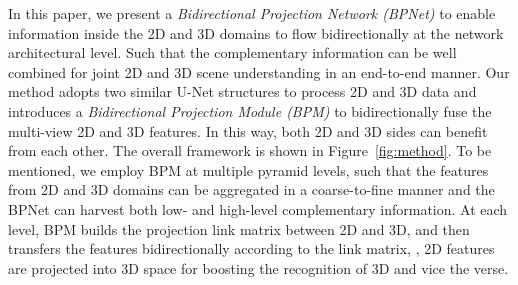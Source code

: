 \documentclass[final]{cvpr}
\begin{document}
In this paper,  we present a \emph{Bidirectional Projection Network (BPNet)} to enable information inside the 2D and 3D domains to flow bidirectionally at the network architectural level.
Such that the complementary information can be well combined for joint 2D and 3D scene understanding in an end-to-end manner.
Our method adopts two similar U-Net structures to process 2D and 3D data and introduces a \emph{Bidirectional Projection Module (BPM)} to bidirectionally fuse the multi-view 2D and 3D features. 
In this way, both 2D and 3D sides can benefit from each other. The overall framework is shown in Figure~\ref{fig:method}.
To be mentioned, we employ BPM at multiple pyramid levels, such that the features from 2D and 3D domains can be aggregated in a coarse-to-fine manner and the BPNet can harvest both low- and high-level complementary information. 
At each level, BPM builds the projection link matrix between 2D and 3D, and then transfers the features bidirectionally according to the link matrix, \ie, 2D features are projected into 3D space for boosting the recognition of 3D and vice the verse.
\end{document}
